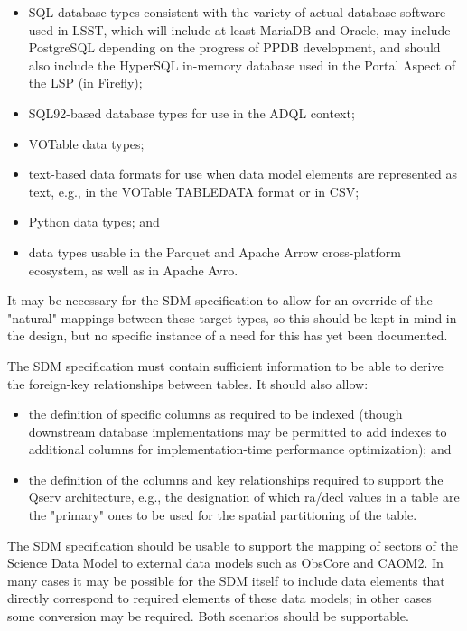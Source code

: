 \begin{itemize}
\item     SQL database types consistent with the variety of actual database software used in LSST, which will include at least MariaDB and Oracle, may include PostgreSQL depending on the progress of PPDB development, and should also include the HyperSQL in-memory database used in the Portal Aspect of the LSP (in Firefly);
    \item SQL92-based database types for use in the ADQL context;
    \item VOTable data types;
    \item text-based data formats for use when data model elements are represented as text, e.g., in the VOTable TABLEDATA format or in CSV;
    \item Python data types; and
    \item data types usable in the Parquet and Apache Arrow cross-platform ecosystem, as well as in Apache Avro.
\end{itemize}

It may be necessary for the SDM specification to allow for an override of the "natural" mappings between these target types, so this should be kept in mind in the design, but no specific instance of a need for this has yet been documented.


The SDM specification must contain sufficient information to be able to derive the foreign-key relationships between tables.  It should also allow:
\begin{itemize}
\item the definition of specific columns as required to be indexed (though downstream database implementations may be permitted to add indexes to additional columns for implementation-time performance optimization); and
    \item the definition of the columns and key relationships required to support the Qserv architecture, e.g., the designation of which ra/decl values in a table are the "primary" ones to be used for the spatial partitioning of the table.
\end{itemize}

The SDM specification should be usable to support the mapping of sectors of the Science Data Model to external data models such as ObsCore and CAOM2.  In many cases it may be possible for the SDM itself to include data elements that directly correspond to required elements of these data models; in other cases some conversion may be required.  Both scenarios should be supportable.

